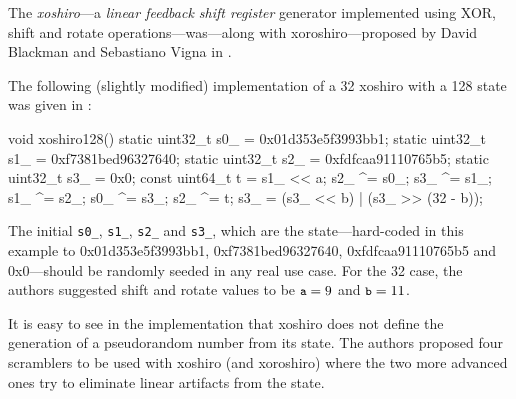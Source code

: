     The \emph{xoshiro}---a \emph{linear feedback shift register} generator implemented using XOR, shift and rotate operations---was---along with xoroshiro---proposed by David Blackman and Sebastiano Vigna in \cite{Blackman:2018}.

    The following (slightly modified) implementation of a \SI{32}{\bit} xoshiro with a \SI{128}{\bit} state was given in \cite{Blackman:2018}:
\begin{@empty}
    \lstset{
        language = [ISO]C++
    }
\begin{centeredshadowboxlisting}
void xoshiro128() {
    static uint32_t s0_ = 0x01d353e5f3993bb1;
    static uint32_t s1_ = 0xf7381bed96327640;
    static uint32_t s2_ = 0xfdfcaa91110765b5;
    static uint32_t s3_ = 0x0;
    const uint64_t t = s1_ << a;
    s2_ ^= s0_;
    s3_ ^= s1_;
    s1_ ^= s2_;
    s0_ ^= s3_;
    s2_ ^= t;
    s3_ = (s3_ << b) | (s3_ >> (32 - b));
}
\end{centeredshadowboxlisting}
\end{@empty}
    \textcolor{black!75}{The initial \lstinline|s0_|, \lstinline|s1_|, \lstinline|s2_| and \lstinline|s3_|, which are the state---hard-coded in this example to 0x01d353e5f3993bb1, 0xf7381bed96327640, 0xfdfcaa91110765b5 and 0x0---should be randomly seeded in any real use case.} For the \SI{32}{\bit} case, the authors suggested shift and rotate values to be $\texttt{\small a} = 9$ and $\texttt{\small b} = 11$.

    It is easy to see in the implementation that xoshiro does not define the generation of a pseudorandom number from its state. The authors proposed four scramblers to be used with xoshiro (and xoroshiro) where the two more advanced ones try to eliminate linear artifacts from the state.
    
